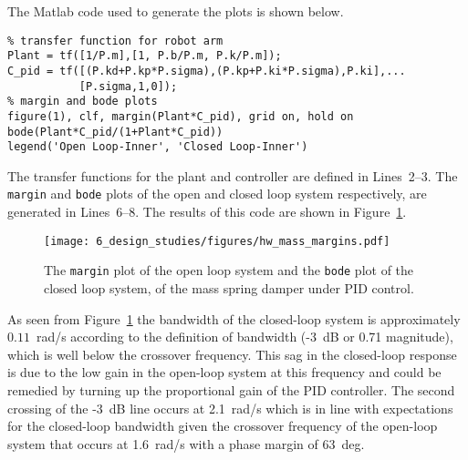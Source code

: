 The Matlab code used to generate the plots is shown below.
\begin{lstlisting}
% transfer function for robot arm
Plant = tf([1/P.m],[1, P.b/P.m, P.k/P.m]);
C_pid = tf([(P.kd+P.kp*P.sigma),(P.kp+P.ki*P.sigma),P.ki],...
		   [P.sigma,1,0]);
% margin and bode plots 
figure(1), clf, margin(Plant*C_pid), grid on, hold on
bode(Plant*C_pid/(1+Plant*C_pid)) 
legend('Open Loop-Inner', 'Closed Loop-Inner')
\end{lstlisting}
The transfer functions for the plant and controller are defined in Lines~2--3.  The {\tt margin} and {\tt bode} plots of the open and closed loop system respectively, are generated in Lines~6--8.
The results of this code are shown in Figure~\ref{fig:hw_mass_margins}.
\begin{figure}[H]
   \centering
   \texttt{[image: 6\_design\_studies/figures/hw\_mass\_margins.pdf]}
   \caption{The {\tt margin} plot of the open loop system and the {\tt bode} plot of the closed loop system, of the mass spring damper under PID control.}
   \label{fig:hw_mass_margins}
\end{figure} 

As seen from Figure~\ref{fig:hw_mass_margins} the bandwidth of the closed-loop system is approximately $0.11$~rad/s according to the definition of bandwidth (-3~dB or 0.71 magnitude), which is well below the crossover frequency. This sag in the closed-loop response is due to the low gain in the open-loop system at this frequency and could be remedied by turning up the proportional gain of the PID controller. The second crossing of the -3~dB line occurs at 2.1~rad/s which is in line with expectations for the closed-loop bandwidth given the crossover frequency of the open-loop system that occurs at 1.6~rad/s with a phase margin of 63~deg.
